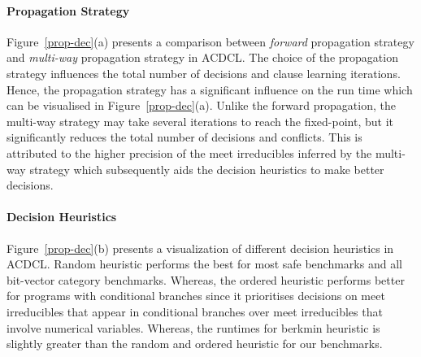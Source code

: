 \paragraph {\textbf{Propagation Strategy}}      
Figure~\ref{prop-dec}(a)  presents a comparison between {\em forward} propagation 
strategy and {\em multi-way} propagation strategy in ACDCL.  The choice of the
propagation strategy influences the total number of decisions and clause 
learning iterations.  Hence, the propagation strategy has a significant 
influence on the run time which can be visualised in Figure~\ref{prop-dec}(a).  
Unlike the forward propagation, the multi-way strategy may take several 
iterations  to reach the fixed-point, but it significantly reduces the 
total number of decisions and conflicts.  This is attributed to the higher 
precision of the meet irreducibles inferred by the multi-way strategy which 
subsequently aids the decision heuristics to make better decisions. 

\paragraph {\textbf{Decision Heuristics}} Figure~\ref{prop-dec}(b) presents a 
visualization of different decision heuristics in ACDCL.  Random heuristic
performs the best for most safe benchmarks and all bit-vector category 
benchmarks.  Whereas, the ordered heuristic performs better for programs 
with conditional branches since it prioritises decisions on meet 
irreducibles that appear in conditional branches over meet irreducibles 
that involve numerical variables.  Whereas, the runtimes for berkmin 
heuristic is slightly greater than the random and ordered heuristic 
for our benchmarks. 

